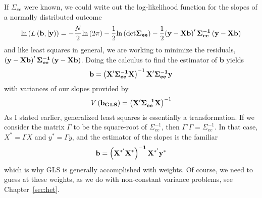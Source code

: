 If $\Sigma_{ee}$ were known, we could write out the log-likelihood function for the slopes of a normally distributed outcome
\begin{equation}
\mbox{ln}\left(L\left({\bf b, \vert \bf y}\right)\right)=-\frac{N}{2}\mbox{ln}\left(2\pi\right)-\frac{1}{2}\mbox{ln}\left(\mbox{det}\bf \Sigma_{ee}\right)-\frac{1}{2}{\bf \left(y-Xb\right)'\Sigma_{ee}^{-1}\left(y-Xb\right)}
\end{equation}
and like least squares in general, we are working to minimize the residuals, ${\bf \left(y-Xb\right)'\Sigma_{ee}^{-1}\left(y-Xb\right)}$. Doing the calculus to find the estimator of {\bf b} yields
\begin{equation}
{\bf b} = \left({\bf X'\Sigma_{ee}^{-1}X}\right)^{-1}{\bf X'\Sigma_{ee}^{-1}y}
\end{equation}
with variances of our slopes provided by
\begin{equation}
V\left({\bf b_{GLS}}\right)= \left({\bf X'\Sigma_{ee}^{-1}X}\right)^{-1}
\end{equation}
As I stated earlier, generalized least squares is essentially a transformation. If we consider the matrix $\Gamma$ to be the square-root of $\Sigma_{ee}^{-1}$, then $\Gamma'\Gamma = \Sigma_{ee}^{-1}$. In that case, $X^{*} = \Gamma X$ and $y^{*} = \Gamma y$, and the estimator of the slopes is the familiar
\begin{equation}
{\bf b = \left(X^{*'}X^{*}\right)^{-1}X^{*'}y^{*}}
\end{equation}
which is why GLS is generally accomplished with weights. Of course, we need to guess at these weights, as we do with non-constant variance problems, see Chapter~\ref{sec:het}.
